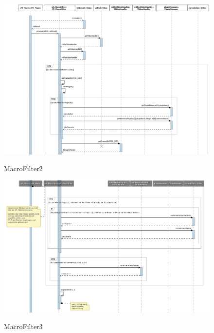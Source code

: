 \begin{figure}[h]
\includegraphics[width=\linewidth]{bilder/Sequenzdiagramm/Macro2.png}
\label{}
\caption{MacroFilter2}
\end{figure}

\begin{figure}[h]
\includegraphics[width=\linewidth]{bilder/Sequenzdiagramm/Macro3.png}
\label{}
\caption{MacroFilter3}
\end{figure}


